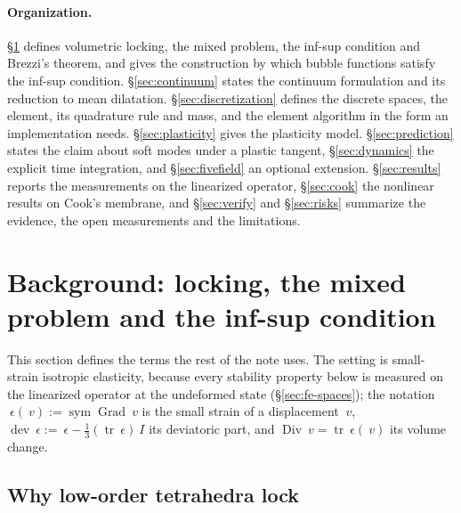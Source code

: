 \documentclass[11pt]{article}
\newcommand{\Id}{~I}
\newcommand{\eps}{~\epsilon}
\newcommand{\Grad}{\operatorname{Grad}}
\newcommand{\Div}{\operatorname{Div}}
\newcommand{\dev}{\operatorname{dev}}
\newcommand{\trace}{\operatorname{tr}}
\newcommand{\sym}{\operatorname{sym}}
\theoremstyle{definition}
\theoremstyle{plain}
\begin{document}
\paragraph{Organization.} \S\ref{sec:background} defines volumetric locking,
the mixed problem, the inf-sup condition and Brezzi's theorem, and gives the
construction by which bubble functions satisfy the inf-sup condition.
\S\ref{sec:continuum} states the continuum formulation and its reduction to
mean dilatation. \S\ref{sec:discretization} defines the discrete spaces, the
element, its quadrature rule and mass, and the element algorithm in the form
an implementation needs. \S\ref{sec:plasticity} gives the plasticity model.
\S\ref{sec:prediction} states the claim about soft modes under a plastic
tangent, \S\ref{sec:dynamics} the explicit time integration, and
\S\ref{sec:fivefield} an optional extension. \S\ref{sec:results} reports the
measurements on the linearized operator, \S\ref{sec:cook} the nonlinear
results on Cook's membrane, and \S\ref{sec:verify} and \S\ref{sec:risks}
summarize the evidence, the open measurements and the limitations.

\section{Background: locking, the mixed problem and the inf-sup condition}
\label{sec:background}

This section defines the terms the rest of the note uses. The setting is
small-strain isotropic elasticity, because every stability property below is
measured on the linearized operator at the undeformed state
(\S\ref{sec:fe-spaces}); the notation $\eps(~v) := \sym\Grad~v$ is the
small strain of a displacement $~v$, $\dev\eps := \eps - \tfrac13(\trace\eps)\Id$
its deviatoric part, and $\Div ~v = \trace\eps(~v)$ its volume change.

\subsection{Why low-order tetrahedra lock}
\label{sec:whylock}
\end{document}
